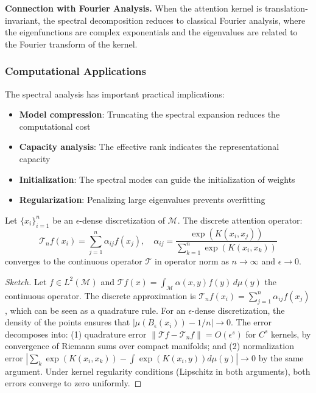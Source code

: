 \textbf{Connection with Fourier Analysis.}\label{rem:fourier_connection} When the attention kernel is translation-invariant, the spectral decomposition reduces to classical Fourier analysis, where the eigenfunctions are complex exponentials and the eigenvalues are related to the Fourier transform of the kernel.

\subsubsection{Computational Applications}

The spectral analysis has important practical implications:

\begin{itemize}
    \item \textbf{Model compression}: Truncating the spectral expansion reduces the computational cost
    \item \textbf{Capacity analysis}: The effective rank indicates the representational capacity
    \item \textbf{Initialization}: The spectral modes can guide the initialization of weights
    \item \textbf{Regularization}: Penalizing large eigenvalues prevents overfitting
\end{itemize}

\begin{theorem}\label{theorem:finite_attention_approximation}
    Let $\{x_i\}_{i=1}^n$ be an $\epsilon$-dense discretization of $\mathcal{M}$. The discrete attention operator:
    \begin{equation}
        \mathcal{T}_n f(x_i) = \sum_{j=1}^n \alpha_{ij} f(x_j), \quad \alpha_{ij} = \frac{\exp(K(x_i, x_j))}{\sum_{k=1}^n \exp(K(x_i, x_k))}
    \end{equation}
    converges to the continuous operator $\mathcal{T}$ in operator norm as $n \to \infty$ and $\epsilon \to 0$.
\end{theorem}

\begin{proof}[Sketch]
Let $f \in L^2(\mathcal{M})$ and $\mathcal{T}f(x) = \int_{\mathcal{M}} \alpha(x,y) f(y) \, d\mu(y)$ the continuous operator. The discrete approximation is $\mathcal{T}_n f(x_i) = \sum_{j=1}^n \alpha_{ij} f(x_j)$, which can be seen as a quadrature rule. For an $\epsilon$-dense discretization, the density of the points ensures that $|\mu(B_\epsilon(x_i)) - 1/n| \to 0$. The error decomposes into: (1) quadrature error $\|\mathcal{T}f - \mathcal{T}_n f\| = O(\epsilon^s)$ for $C^s$ kernels, by convergence of Riemann sums over compact manifolds; and (2) normalization error $|\sum_k \exp(K(x_i,x_k)) - \int \exp(K(x_i,y)) d\mu(y)| \to 0$ by the same argument. Under kernel regularity conditions (Lipschitz in both arguments), both errors converge to zero uniformly.
\end{proof}

